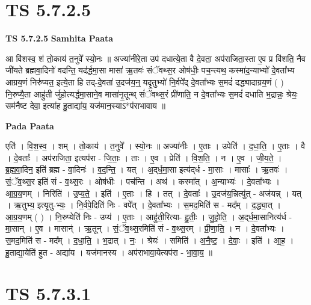 \documentclass[17pt]{extarticle}
\begin{document}

\section{ TS 5.7.2.5 }

\textbf{TS 5.7.2.5 } \newline
\textbf{Samhita Paata} \newline

आ वि॑शस्व॒ शं तो॒काय॑ त॒नुवे᳚ स्यो॒नः ॥ अज्या॑नीरे॒ता उप॑ दधात्ये॒ता वै दे॒वता॒ अप॑राजिता॒स्ता ए॒व प्र वि॑शति॒ नैव जी॑यते ब्रह्मवा॒दिनो॑ वदन्ति॒ यद॑र्द्धमा॒सा मासा॑ ऋ॒तवः॑ संॅवथ्स॒र ओष॑धीः॒ पच॒न्त्यथ॒ कस्मा॑द॒न्याभ्यो॑ दे॒वता᳚भ्य आग्रय॒णं निरु॑प्यत॒ इत्ये॒ता हि तद्-दे॒वता॑ उ॒दज॑य॒न्॒ यदृ॒तुभ्यो॑ नि॒र्वपे᳚द् दे॒वता᳚भ्यः स॒मदं॑ दद्ध्यादाग्रय॒णं ( ) नि॒रुप्यै॒ता आहु॑ती र्जुहोत्यर्द्धमा॒साने॒व मासा॑नृ॒तून्थ् सं॑ॅवथ्स॒रं प्री॑णाति॒ न दे॒वता᳚भ्यः स॒मदं॑ दधाति भ॒द्रान्नः॒ श्रेयः॒ सम॑नैष्ट देवा॒ इत्या॑ह हु॒ताद्या॑य॒ यज॑मान॒स्याऽ*प॑राभावाय ॥ \newline

\textbf{Pada Paata} \newline

एति॑ । वि॒श॒स्व॒ । शम् । तो॒काय॑ । त॒नुवे᳚ । स्यो॒नः ॥ अज्या॑नीः । ए॒ताः । उपेति॑ । द॒धा॒ति॒ । ए॒ताः । वै । दे॒वताः᳚ । अप॑राजिता॒ इत्यप॑रा - जि॒ताः॒ । ताः । ए॒व । प्रेति॑ । वि॒श॒ति॒ । न । ए॒व । जी॒य॒ते॒ । ब्र॒ह्म॒वा॒दिन॒ इति॑ ब्रह्म - वा॒दिनः॑ । व॒द॒न्ति॒ । यत् । अ॒द्‌र्ध॒मा॒सा इत्य॑द्‌र्ध - मा॒साः । मासाः᳚ । ऋ॒तवः॑ । सं॒ॅव॒थ्स॒र इति॑ सं - व॒थ्स॒रः । ओष॑धीः । पच॑न्ति । अथ॑ । कस्मा᳚त् । अ॒न्याभ्यः॑ । दे॒वता᳚भ्यः । आ॒ग्र॒य॒णम् । निरिति॑ । उ॒प्य॒ते॒ । इति॑ । ए॒ताः । हि । तत् । दे॒वताः᳚ । उ॒दज॑य॒न्नित्यु॑त् - अज॑यन्न् । यत् । ऋ॒तुभ्य॒ इत्यृ॒तु-भ्यः॒ । नि॒र्वपे॒दिति॑ निः - वपे᳚त् । दे॒वता᳚भ्यः । स॒मद॒मिति॑ स - मद᳚म् । द॒द्ध्या॒त् । आ॒ग्र॒य॒णम् ( ) । नि॒रुप्येति॑ निः - उप्य॑ । ए॒ताः । आहु॑ती॒रित्या- हु॒तीः॒ । जु॒हो॒ति॒ । अ॒द्‌र्ध॒मा॒सानित्य॑र्ध - मा॒सान् । ए॒व । मासान्॑ । ऋ॒तून् । सं॒ॅव॒थ्स॒रमिति॑ सं - व॒थ्स॒रम् । प्री॒णा॒ति॒ । न । दे॒वता᳚भ्यः । स॒मद॒मिति॑ स - मद᳚म् । द॒धा॒ति॒ । भ॒द्रात् । नः॒ । श्रेयः॑ । समिति॑ । अ॒नै॒ष्ट॒ । दे॒वाः॒ । इति॑ । आ॒ह॒ । हु॒ताद्या॒येति॑ हुत - अद्या॑य । यज॑मानस्य । अप॑राभावा॒येत्यप॑रा - भा॒वा॒य॒ ॥  \newline





\section{ TS 5.7.3.1 }
\end{document}
